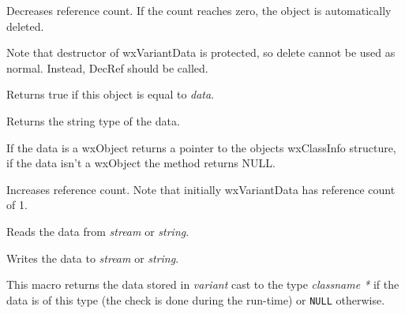 
Decreases reference count. If the count reaches zero, the object is
automatically deleted.

Note that destructor of wxVariantData is protected, so delete
cannot be used as normal. Instead, DecRef should be called.

\label{wxvariantdataeq}


Returns true if this object is equal to {\it data}.

\label{wxvariantdatagettype}


Returns the string type of the data.

\label{wxvariantdatagetvalueclassinfo}


If the data is a wxObject returns a pointer to the objects wxClassInfo structure, if
the data isn't a wxObject the method returns NULL.

\label{wxvariantdataincref}


Increases reference count. Note that initially wxVariantData has reference count of 1.

\label{wxvariantdataread}



Reads the data from {\it stream} or {\it string}.

\label{wxvariantdatawrite}



Writes the data to {\it stream} or {\it string}.


\label{wxgetvariantcast}


This macro returns the data stored in {\it variant} cast to the type {\it classname *} if
the data is of this type (the check is done during the run-time) or
{\tt NULL} otherwise.



\\
